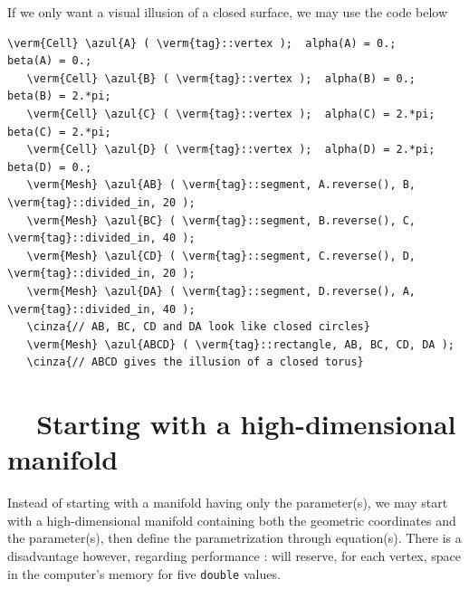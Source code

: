 If we only want a visual illusion of a closed surface, we may use the code below

\begin{Verbatim}[commandchars=\\\{\},formatcom=\small\tt,baselinestretch=0.94]
   \verm{Cell} \azul{A} ( \verm{tag}::vertex );  alpha(A) = 0.;     beta(A) = 0.;
   \verm{Cell} \azul{B} ( \verm{tag}::vertex );  alpha(B) = 0.;     beta(B) = 2.*pi;
   \verm{Cell} \azul{C} ( \verm{tag}::vertex );  alpha(C) = 2.*pi;  beta(C) = 2.*pi;
   \verm{Cell} \azul{D} ( \verm{tag}::vertex );  alpha(D) = 2.*pi;  beta(D) = 0.;
   \verm{Mesh} \azul{AB} ( \verm{tag}::segment, A.reverse(), B, \verm{tag}::divided_in, 20 );
   \verm{Mesh} \azul{BC} ( \verm{tag}::segment, B.reverse(), C, \verm{tag}::divided_in, 40 );
   \verm{Mesh} \azul{CD} ( \verm{tag}::segment, C.reverse(), D, \verm{tag}::divided_in, 20 );
   \verm{Mesh} \azul{DA} ( \verm{tag}::segment, D.reverse(), A, \verm{tag}::divided_in, 40 );
   \cinza{// AB, BC, CD and DA look like closed circles}
   \verm{Mesh} \azul{ABCD} ( \verm{tag}::rectangle, AB, BC, CD, DA );
   \cinza{// ABCD gives the illusion of a closed torus}
\end{Verbatim}


\section{~~Starting with a high-dimensional manifold}\label{\numb section 2.\numb parag 16}

Instead of starting with a manifold having only the parameter(s), we may start with a
high-dimensional manifold containing both the geometric coordinates and the parameter(s),
then define the parametrization through equation(s).
There is a disadvantage however, regarding performance : {\maniFEM} will reserve,
for each vertex, space in the computer's memory for five {\small\tt double} values.

